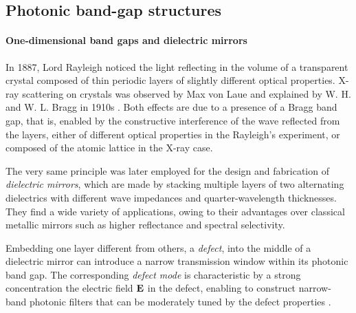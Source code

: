 

\subsection{Photonic band-gap structures} 

\paragraph{One-dimensional band gaps and dielectric mirrors}%
In 1887, Lord Rayleigh \cite{johnson2003introduction} noticed the light reflecting in the volume of a transparent crystal composed of thin periodic layers of slightly different optical properties. X-ray scattering on crystals was observed by Max von Laue \cite{friedrich1913interferenzerscheinungen} and explained by W. H. and W. L. Bragg in 1910s \cite{bragg1913reflection}. 
Both effects are due to a presence of a Bragg band gap, that is, enabled by the constructive interference of the wave reflected from the layers, either of different optical properties in the Rayleigh's experiment, or composed of the atomic lattice in the X-ray case. 

The very same principle was later %
employed for the design and fabrication of \textit{dielectric mirrors}, which are made by stacking multiple layers of two alternating dielectrics with different wave impedances and quarter-wavelength thicknesses. They find a wide variety of applications, owing to their advantages over classical metallic mirrors such as higher reflectance and spectral selectivity.  %

Embedding one layer different from others, a \textit{defect}, into the middle of a dielectric mirror can introduce a narrow transmission window within its photonic band gap. The corresponding \textit{defect mode} is characteristic by a strong concentration the electric field $\mathbf{E}$ in the defect, enabling to construct narrow-band photonic filters that can be moderately tuned by the defect properties \cite{nemec2005highly}.

